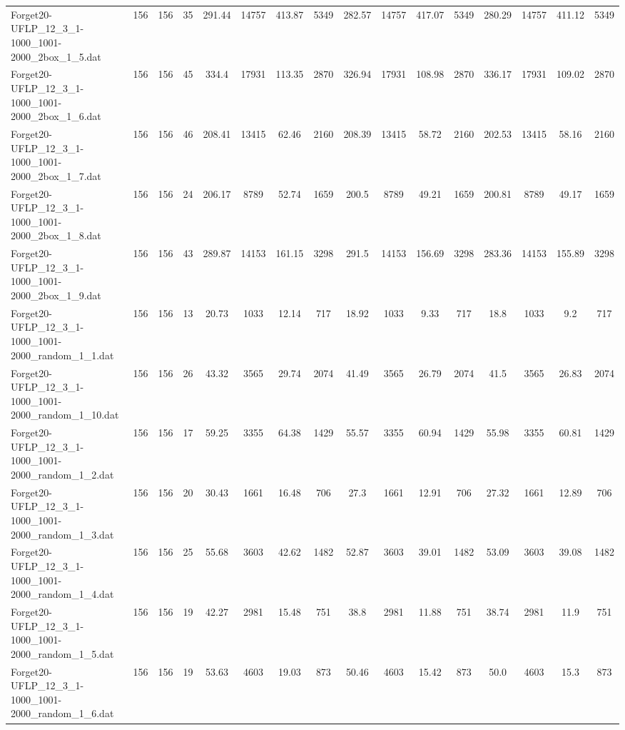 \begin{sidewaystable}[!ht]
{\begin{tabular}{lccccccccccccccc}
Forget20-UFLP\_12\_3\_1-1000\_1001-2000\_2box\_1\_5.dat & 156 & 156 & 35 & 291.44 & 14757 & 413.87 & 5349 & 282.57 & 14757 & 417.07 & 5349 &  \textcolor{blue2}{280.29} & 14757 & 411.12 & 5349 \\
Forget20-UFLP\_12\_3\_1-1000\_1001-2000\_2box\_1\_6.dat & 156 & 156 & 45 & 334.4 & 17931 & 113.35 & 2870 & 326.94 & 17931 &  \textcolor{blue2}{108.98} & 2870 & 336.17 & 17931 & 109.02 & 2870 \\
Forget20-UFLP\_12\_3\_1-1000\_1001-2000\_2box\_1\_7.dat & 156 & 156 & 46 & 208.41 & 13415 & 62.46 & 2160 & 208.39 & 13415 & 58.72 & 2160 & 202.53 & 13415 & 58.16 & 2160 \\
Forget20-UFLP\_12\_3\_1-1000\_1001-2000\_2box\_1\_8.dat & 156 & 156 & 24 & 206.17 & 8789 & 52.74 & 1659 & 200.5 & 8789 & 49.21 & 1659 & 200.81 & 8789 & 49.17 & 1659 \\
Forget20-UFLP\_12\_3\_1-1000\_1001-2000\_2box\_1\_9.dat & 156 & 156 & 43 & 289.87 & 14153 & 161.15 & 3298 & 291.5 & 14153 & 156.69 & 3298 & 283.36 & 14153 &  \textcolor{blue2}{155.89} & 3298 \\
Forget20-UFLP\_12\_3\_1-1000\_1001-2000\_random\_1\_1.dat & 156 & 156 & 13 & 20.73 & 1033 & 12.14 & 717 & 18.92 & 1033 & 9.33 & 717 & 18.8 & 1033 &  \textcolor{blue2}{9.2} & 717 \\
Forget20-UFLP\_12\_3\_1-1000\_1001-2000\_random\_1\_10.dat & 156 & 156 & 26 & 43.32 & 3565 & 29.74 & 2074 & 41.49 & 3565 &  \textcolor{blue2}{26.79} & 2074 & 41.5 & 3565 & 26.83 & 2074 \\
Forget20-UFLP\_12\_3\_1-1000\_1001-2000\_random\_1\_2.dat & 156 & 156 & 17 & 59.25 & 3355 & 64.38 & 1429 & 55.57 & 3355 & 60.94 & 1429 & 55.98 & 3355 & 60.81 & 1429 \\
Forget20-UFLP\_12\_3\_1-1000\_1001-2000\_random\_1\_3.dat & 156 & 156 & 20 & 30.43 & 1661 & 16.48 & 706 & 27.3 & 1661 & 12.91 & 706 & 27.32 & 1661 & 12.89 & 706 \\
Forget20-UFLP\_12\_3\_1-1000\_1001-2000\_random\_1\_4.dat & 156 & 156 & 25 & 55.68 & 3603 & 42.62 & 1482 & 52.87 & 3603 &  \textcolor{blue2}{39.01} & 1482 & 53.09 & 3603 & 39.08 & 1482 \\
Forget20-UFLP\_12\_3\_1-1000\_1001-2000\_random\_1\_5.dat & 156 & 156 & 19 & 42.27 & 2981 & 15.48 & 751 & 38.8 & 2981 & 11.88 & 751 & 38.74 & 2981 & 11.9 & 751 \\
Forget20-UFLP\_12\_3\_1-1000\_1001-2000\_random\_1\_6.dat & 156 & 156 & 19 & 53.63 & 4603 & 19.03 & 873 & 50.46 & 4603 & 15.42 & 873 & 50.0 & 4603 &  \textcolor{blue2}{15.3} & 873 \\

\end{tabular}}
\end{sidewaystable}
